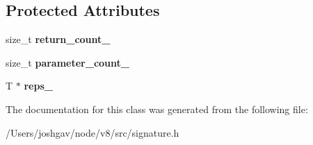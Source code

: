 \subsection*{Protected Attributes}
\begin{DoxyCompactItemize}
\item 
size\+\_\+t {\bfseries return\+\_\+count\+\_\+}\hypertarget{classv8_1_1internal_1_1_signature_a8f5f81d1ef9973b9dd0a6cd507c4e126}{}\label{classv8_1_1internal_1_1_signature_a8f5f81d1ef9973b9dd0a6cd507c4e126}

\item 
size\+\_\+t {\bfseries parameter\+\_\+count\+\_\+}\hypertarget{classv8_1_1internal_1_1_signature_a6fb4fac70d94fe8a4439ca3ba0bc2873}{}\label{classv8_1_1internal_1_1_signature_a6fb4fac70d94fe8a4439ca3ba0bc2873}

\item 
T $\ast$ {\bfseries reps\+\_\+}\hypertarget{classv8_1_1internal_1_1_signature_a17224d8e4b5d24dbc5acc0833cf35d85}{}\label{classv8_1_1internal_1_1_signature_a17224d8e4b5d24dbc5acc0833cf35d85}

\end{DoxyCompactItemize}


The documentation for this class was generated from the following file\+:\begin{DoxyCompactItemize}
\item 
/\+Users/joshgav/node/v8/src/signature.\+h\end{DoxyCompactItemize}
